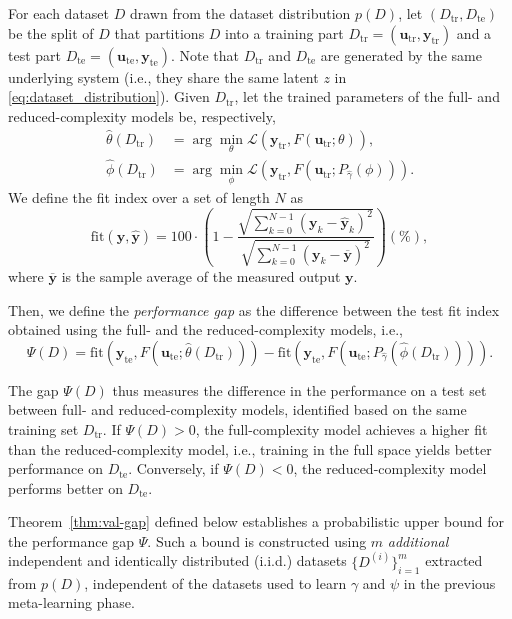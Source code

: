 \documentclass{article}
\newcommand{\tr}{\mathrm{tr}}
\newcommand{\te}{\mathrm{te}}
\newcommand{\seq}[1]{{\mathbf{#1}}}
\newcommand{\loss}{\mathcal{L}}
\newcommand{\latent}{z}
\newcommand{\fullpar}{\theta}
\newcommand{\redpar}{\phi}
\newcommand{\projpar}{\gamma}
\newcommand{\encpar}{\psi}
\newcommand{\M}{F}
\begin{document}
For each dataset $D$ drawn from the dataset distribution $p(D)$,
let $(D_\tr, D_\te)$ be the  split of $D$
that partitions $D$ into a training part $D_\tr=(\seq u_\tr,\seq y_\tr)$ and a test part $D_\te=(\seq u_\te,\seq y_\te)$.
Note that $D_\tr$ and $D_\te$ are generated by the same underlying system (i.e., they share the same latent $\latent$ in \eqref{eq:dataset_distribution}). Given  $D_\tr$, let the trained parameters of the full- and reduced-complexity models be, respectively,
\begin{align}
\hat \fullpar(D_\tr) &= \arg \min_{\fullpar} \loss\!\left(\seq y_\tr,\M(\seq u_\tr;\fullpar)\right), \\
\hat \redpar(D_\tr) &= \arg \min_{\redpar} \loss\!\left(\seq y_\tr, \M(\seq u_\tr; P_{\hat\projpar}(\redpar))\right).
\end{align}
We define the fit index  over a set of length $N$ as
\begin{equation}
\label{eq:fit_index}
\mathrm{fit}(\seq{y}, \hat {\seq{y}}) = 100\cdot \left(1- \frac{\sqrt{\sum_{k=0}^{N-1} \left(\seq{y}_k -  \hat {\seq{y}}_k\right)^2} }
{\sqrt{\sum_{k=0}^{N-1} \left(\seq{y}_k -  {\overline{\seq{y}}}\right)^2}}\right) (\%),
\end{equation}
where ${\overline{\seq{y}}}$ is the sample average of the measured output $\seq y$.

Then, we define the \emph{performance gap} as the difference between the test fit index obtained using the full- and the reduced-complexity models, i.e.,
\begin{equation}
\label{eq:validation_gap}
\Psi(D) =
\mathrm{fit}\!\left(\!\seq y_\te,\M(\seq u_\te;\hat \fullpar(D_\tr))\!\right) - \mathrm{fit}\!\left(\!\seq y_\te,\M(\seq u_\te;P_{\hat\projpar}(\hat \redpar(D_\tr)))\!\right).
\end{equation}

The gap $\Psi(D)$ thus measures the  difference in the performance on a test set between full- and reduced-complexity models, identified based on the same training set $D_\tr$. If $\Psi(D) > 0$, the full-complexity model achieves a higher fit than the reduced-complexity  model, i.e., training in the full space yields better performance on $D_\te$. Conversely, if $\Psi(D) < 0$, the reduced-complexity model performs better on $D_\te$.

Theorem~\ref{thm:val-gap} defined below establishes a probabilistic upper bound for the performance gap $\Psi$. Such a bound is constructed using $m$ \emph{additional} independent and identically distributed (i.i.d.) datasets $\{D^{(i)}\}_{i=1}^m$
extracted from $p(D)$, independent of the datasets used to learn $\projpar$ and $\encpar$ in the previous meta-learning phase.
\end{document}
